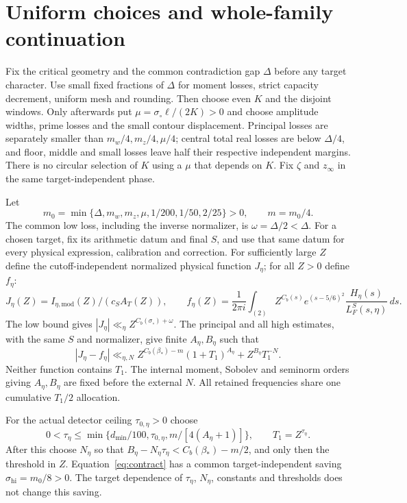 \documentclass[11pt,a4paper]{article}
\theoremstyle{definition}
\newcommand{\sig}{\sigma_\circ}
\newcommand{\bet}{\beta_*}
\begin{document}
\section{Uniform choices and whole-family continuation}
\label{sec:continuation}
Fix the critical geometry and the common contradiction gap
$\Delta$ before any target character.
Use small fixed fractions of $\Delta$ for moment losses, strict
capacity decrement, uniform mesh and rounding.
Then choose even $K$ and the disjoint windows.
Only afterwards put $\mu=\sig\ell/(2K)>0$ and choose amplitude
widths, prime losses and the small contour displacement.
Principal losses are separately smaller than
$m_w/4,m_z/4,\mu/4$; central total real losses are below
$\Delta/4$, and floor, middle and small losses leave half their
respective independent margins.
There is no circular selection of $K$ using a $\mu$ that
depends on $K$.
Fix $\zeta$ and $z_\infty$ in the same target-independent phase.

Let
\[
 m_0=\min\{\Delta,m_w,m_z,\mu,1/200,1/50,2/25\}>0,\qquad m=m_0/4.
\]
The common low loss, including the inverse normalizer, is
$\omega=\Delta/2<\Delta$.
For a chosen target, fix its arithmetic datum and final $S$,
and use that same datum for every physical expression,
calibration and correction.
For sufficiently large $Z$ define the cutoff-independent
normalized physical function $J_\eta$; for all $Z>0$ define $f_\eta$:
\[
 J_\eta(Z)=I_{\eta,\mathrm{mod}}(Z)/(c_S A_T(Z)),\qquad
 f_\eta(Z)=\frac1{2\pi i}\int_{(2)}
  Z^{C_b(s)}e^{(s-5/6)^2}\frac{H_\eta(s)}{L_F^S(s,\eta)}\,ds.
\]
The low bound gives
$|J_\eta|\ll_\eta Z^{C_b(\sig)+\omega}$.
The principal and all high estimates, with the same $S$ and
normalizer, give finite $A_\eta,B_\eta$ such that
\begin{equation}\label{eq:contract}
 |J_\eta-f_\eta|\ll_{\eta,N}
 Z^{C_b(\bet)-m}(1+T_1)^{A_\eta}
       +Z^{B_\eta}T_1^{-N}.
\end{equation}
Neither function contains $T_1$.
The internal moment, Sobolev and seminorm orders giving
$A_\eta,B_\eta$ are fixed before the external $N$.
All retained frequencies share one cumulative $T_1/2$ allocation.

For the actual detector ceiling $\tau_{0,\eta}>0$ choose
\[
 0<\tau_\eta\le
 \min\{d_{\min}/100,\tau_{0,\eta},m/[4(A_\eta+1)]\},
 \qquad T_1=Z^{\tau_\eta}.
\]
After this choose $N_\eta$ so that
$B_\eta-N_\eta\tau_\eta<C_b(\bet)-m/2$, and only then the
threshold in $Z$.
Equation~\eqref{eq:contract} has a common target-independent
saving $\sigma_{\mathrm{hi}}=m_0/8>0$.
The target dependence of $\tau_\eta$, $N_\eta$, constants and
thresholds does not change this saving.
\end{document}
